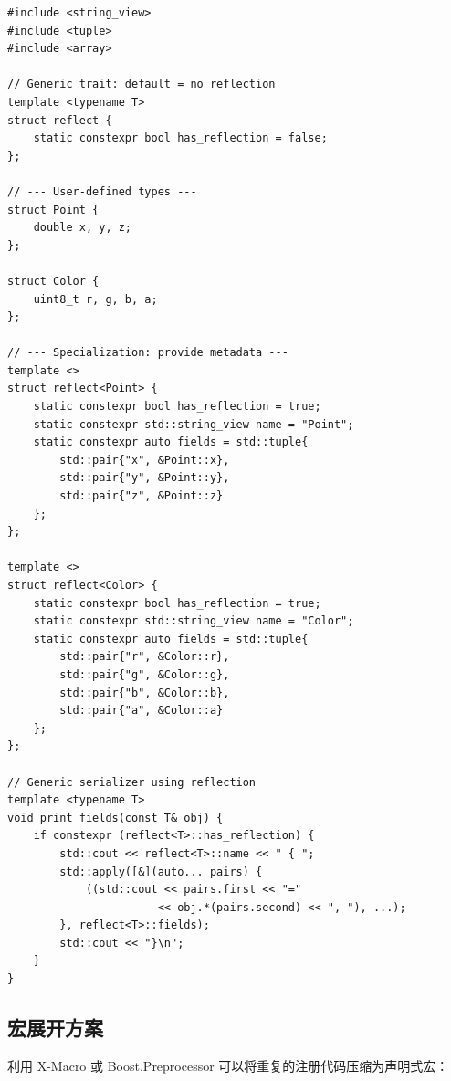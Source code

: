 \documentclass[12pt,a4paper,fontset=fandol]{ctexbook}
\begin{document}
\begin{lstlisting}[caption={模板特化: 类外元信息注册}]
#include <string_view>
#include <tuple>
#include <array>

// Generic trait: default = no reflection
template <typename T>
struct reflect {
    static constexpr bool has_reflection = false;
};

// --- User-defined types ---
struct Point {
    double x, y, z;
};

struct Color {
    uint8_t r, g, b, a;
};

// --- Specialization: provide metadata ---
template <>
struct reflect<Point> {
    static constexpr bool has_reflection = true;
    static constexpr std::string_view name = "Point";
    static constexpr auto fields = std::tuple{
        std::pair{"x", &Point::x},
        std::pair{"y", &Point::y},
        std::pair{"z", &Point::z}
    };
};

template <>
struct reflect<Color> {
    static constexpr bool has_reflection = true;
    static constexpr std::string_view name = "Color";
    static constexpr auto fields = std::tuple{
        std::pair{"r", &Color::r},
        std::pair{"g", &Color::g},
        std::pair{"b", &Color::b},
        std::pair{"a", &Color::a}
    };
};

// Generic serializer using reflection
template <typename T>
void print_fields(const T& obj) {
    if constexpr (reflect<T>::has_reflection) {
        std::cout << reflect<T>::name << " { ";
        std::apply([&](auto... pairs) {
            ((std::cout << pairs.first << "="
                       << obj.*(pairs.second) << ", "), ...);
        }, reflect<T>::fields);
        std::cout << "}\n";
    }
}
\end{lstlisting}

\subsection{宏展开方案}\label{subsec:macro_expand}

利用 X-Macro 或 Boost.Preprocessor 可以将重复的注册代码压缩为声明式宏：
\end{document}
